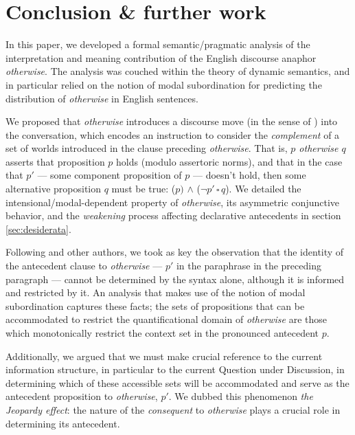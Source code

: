 
\section{Conclusion \& further work}
\label{sec:conclusion}


In this paper, we developed a formal semantic/pragmatic analysis of the interpretation and meaning contribution of the English discourse anaphor \textit{otherwise}. The analysis was couched within the theory of dynamic semantics, and in particular relied on the notion of modal subordination for predicting the distribution of \textit{otherwise} in English sentences. 

We proposed that \textit{otherwise} introduces a discourse move (in the sense of \citealt{Roberts2012}) into the conversation, which encodes an instruction to consider the \textit{complement} of a set of worlds introduced in the clause preceding \textit{otherwise}. That is, \textit{$ p $ otherwise $ q $} asserts that proposition $p$ holds (modulo assertoric norms), and that in the case that $ p' $ --- some component proposition of $ p $ --- doesn't hold, then some alternative proposition $q$ must be true: ($p)$ $\wedge$ ($\neg p'\,\square\,q$). We detailed the intensional/modal-dependent property of \textit{otherwise}, its asymmetric conjunctive behavior, and the \textit{weakening} process affecting declarative antecedents in section \ref{sec:desiderata}. 

Following \citet{Webber2001} and other authors, we took as key the observation that the identity of the antecedent clause to \textit{otherwise} --- $p'$ in the paraphrase in the preceding paragraph ---  cannot be determined by the syntax alone, although it is informed and restricted by it. An analysis that makes use of the notion of {modal subordination} \citep{Roberts1989,Roberts1990,Roberts2020} captures these facts; the sets of propositions that can be accommodated to restrict the quantificational domain of \textit{otherwise} are those which monotonically restrict the context set in the pronounced antecedent $p$.

Additionally, we argued that we must make crucial reference to the current information structure, in particular to the current Question under Discussion, in determining which of these accessible sets will be accommodated and serve as the antecedent proposition to \textit{otherwise}, $ p' $. We dubbed this phenomenon \textit{the Jeopardy effect}: the nature of the \textit{consequent} to \textit{otherwise} plays a crucial role in determining its antecedent.

